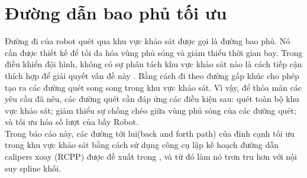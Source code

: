 \section{Đường dẫn bao phủ tối ưu}
\label{subsec:Oppath}
Đường đi của robot quét qua khu vực khảo sát được gọi là đường bao phủ. Nó cần được thiết kế để tối đa hóa vùng phủ sóng và giảm thiểu thời gian bay. Trong điều khiển đội hình, không có sự phân tách khu vực khảo sát nào là cách tiếp cận thích hợp để giải quyết vấn đề này \cite{cabreira2019survey}. Bằng cách đi theo đường gấp khúc \cite{maza2007multiple} cho phép tạo ra các đường quét song song trong khu vực khảo sát. Vì vậy, để thỏa mãn các yêu cầu đã nêu, các đường quét cần đáp ứng các điều kiện sau: quét toàn bộ khu vực khảo sát; giảm thiểu sự chồng chéo giữa vùng phủ sóng của các đường quét; và tối ưu hóa số lượt của bầy Robot.\\

Trong báo cáo này, các đường tới lui(back and forth path) của đỉnh cạnh tối ưu trong khu vực khảo sát bằng cách sử dụng công cụ lập kế hoạch đường dẫn calipers xoay (RCPP) được đề xuất trong \cite{vasquez2020coverage}, và từ đó làm nó trơn tru hơn với nội suy spline khối.
